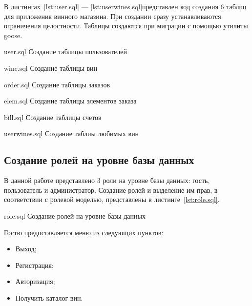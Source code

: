 В листингах~\ref{lst:user.sql} ---  \ref{lst:userwines.sql}представлен код создания 6 таблиц для приложения винного магазина. При создании сразу устанавливаются ограничения целостности. Таблицы создаются при миграции с помощью утилиты goose\cite{goose}. 


{user.sql} %
{Создание таблицы пользователей} %

{wine.sql} %
    {Создание таблицы вин} %
    
{order.sql} %
    {Создание таблицы заказов} %
    
{elem.sql} %
    {Создание таблицы элементов заказа} %

    
{bill.sql} %
    {Создание таблицы счетов} %
    
{userwines.sql} %
    {Создание таблиы любимых вин} %
    
\subsection{Создание ролей на уровне базы данных}

В данной работе представлено 3 роли на уровне базы данных: гость, пользователь и администратор. Создание ролей и выделение им прав, в соответствии с ролевой моделью, представлены в листинге~\ref{lst:role.sql}. 

{role.sql} %
    {Создание ролей на уровне базы данных} %

Гостю предоставляется меню из следующих пунктов:
\begin{itemize}[label*=---]
	\item Выход;
	\item Регистрация;
        \item Авторизация;
        \item Получить каталог вин.
\end{itemize}

